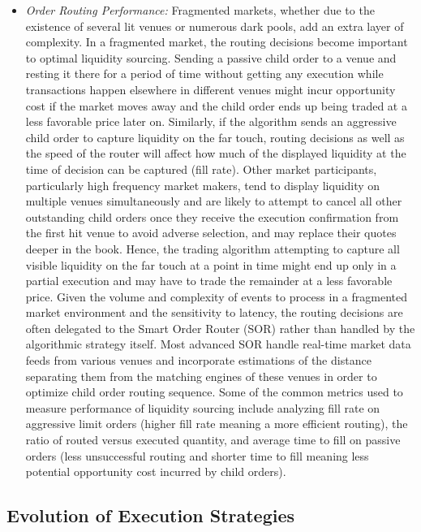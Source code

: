 \begin{itemize}
\item \emph{Order Routing Performance:} Fragmented markets, whether due to the existence of several lit venues or numerous dark pools, add an extra layer of complexity. In a fragmented market, the routing decisions become important to optimal liquidity sourcing. Sending a passive child order to a venue and resting it there for a period of time without getting any execution while transactions happen elsewhere in different venues might incur opportunity cost if the market moves away and the child order ends up being traded at a less favorable price later on. Similarly, if the algorithm sends an aggressive child order to capture liquidity on the far touch, routing decisions as well as the speed of the router will affect how much of the displayed liquidity at the time of decision can be captured (fill rate). Other market participants, particularly high frequency market makers, tend to display liquidity on multiple venues simultaneously and are likely to attempt to cancel all other outstanding child orders once they receive the execution confirmation from the first hit venue to avoid adverse selection, and may replace their quotes deeper in the book. Hence, the trading algorithm attempting to capture all visible liquidity on the far touch at a point in time might end up only in a partial execution and may have to trade the remainder at a less favorable price. Given the volume and complexity of events to process in a fragmented market environment and the sensitivity to latency, the routing decisions are often delegated to the Smart Order Router (SOR) rather than handled by the algorithmic strategy itself. Most advanced SOR handle real-time market data feeds from various venues and incorporate estimations of the distance separating them from the matching engines of these venues in order to optimize child order routing sequence. Some of the common metrics used to measure performance of liquidity sourcing include analyzing fill rate on aggressive limit orders (higher fill rate meaning a more efficient routing), the ratio of routed versus executed quantity, and average time to fill on passive orders (less unsuccessful routing and shorter time to fill meaning less potential opportunity cost incurred by child orders).
\end{itemize}

\subsection{Evolution of Execution Strategies}


